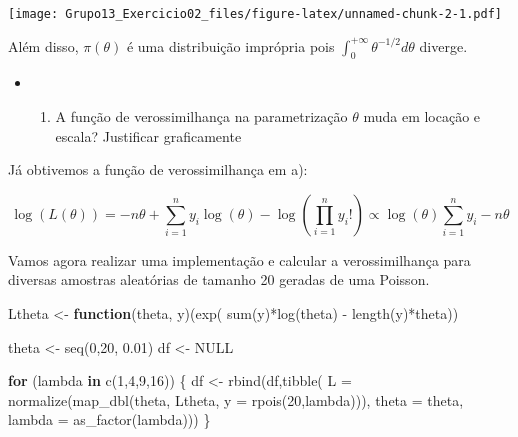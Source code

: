 \documentclass[
]{article}
\newenvironment{Shaded}{\begin{snugshade}}{\end{snugshade}}
\newcommand{\AttributeTok}[1]{\textcolor[rgb]{0.77,0.63,0.00}{#1}}
\newcommand{\ConstantTok}[1]{\textcolor[rgb]{0.00,0.00,0.00}{#1}}
\newcommand{\ControlFlowTok}[1]{\textcolor[rgb]{0.13,0.29,0.53}{\textbf{#1}}}
\newcommand{\DecValTok}[1]{\textcolor[rgb]{0.00,0.00,0.81}{#1}}
\newcommand{\FloatTok}[1]{\textcolor[rgb]{0.00,0.00,0.81}{#1}}
\newcommand{\FunctionTok}[1]{\textcolor[rgb]{0.00,0.00,0.00}{#1}}
\newcommand{\NormalTok}[1]{#1}
\newcommand{\OtherTok}[1]{\textcolor[rgb]{0.56,0.35,0.01}{#1}}
\newcommand{\SpecialCharTok}[1]{\textcolor[rgb]{0.00,0.00,0.00}{#1}}
\providecommand{\tightlist}{%
  \setlength{\itemsep}{0pt}\setlength{\parskip}{0pt}}
\begin{document}
\texttt{[image: Grupo13\_Exercicio02\_files/figure-latex/unnamed-chunk-2-1.pdf]}

Além disso, \(\pi(\theta)\) é uma distribuição imprópria pois
\(\int_0^{+\infty} \theta^{-1/2}d\theta\) diverge.

\begin{itemize}
\item
  \begin{enumerate}
  \def\labelenumi{\alph{enumi})}
  \setcounter{enumi}{1}
  \tightlist
  \item
    A função de verossimilhança na parametrização \(\theta\) muda em
    locação e escala? Justificar graficamente
  \end{enumerate}
\end{itemize}

Já obtivemos a função de verossimilhança em a):

\[\log(L(\theta)) = -n\theta + \sum_{i=1}^n y_i\log(\theta) - \log\left(\prod_{i=1}^n y_i!\right) \propto
\log(\theta)\sum_{i=1}^n y_i -n\theta \]

Vamos agora realizar uma implementação e calcular a verossimilhança para
diversas amostras aleatórias de tamanho 20 geradas de uma Poisson.

\begin{Shaded}
\begin{Highlighting}[]
\NormalTok{Ltheta }\OtherTok{\textless{}{-}} \ControlFlowTok{function}\NormalTok{(theta, y)(}\FunctionTok{exp}\NormalTok{( }\FunctionTok{sum}\NormalTok{(y)}\SpecialCharTok{*}\FunctionTok{log}\NormalTok{(theta) }\SpecialCharTok{{-}} \FunctionTok{length}\NormalTok{(y)}\SpecialCharTok{*}\NormalTok{theta))}

\NormalTok{theta }\OtherTok{\textless{}{-}} \FunctionTok{seq}\NormalTok{(}\DecValTok{0}\NormalTok{,}\DecValTok{20}\NormalTok{, }\FloatTok{0.01}\NormalTok{)}
\NormalTok{df }\OtherTok{\textless{}{-}} \ConstantTok{NULL}

\ControlFlowTok{for}\NormalTok{ (lambda }\ControlFlowTok{in} \FunctionTok{c}\NormalTok{(}\DecValTok{1}\NormalTok{,}\DecValTok{4}\NormalTok{,}\DecValTok{9}\NormalTok{,}\DecValTok{16}\NormalTok{)) \{}
\NormalTok{    df }\OtherTok{\textless{}{-}} \FunctionTok{rbind}\NormalTok{(df,}\FunctionTok{tibble}\NormalTok{(}
                          \AttributeTok{L =} \FunctionTok{normalize}\NormalTok{(}\FunctionTok{map\_dbl}\NormalTok{(theta, Ltheta, }\AttributeTok{y =} \FunctionTok{rpois}\NormalTok{(}\DecValTok{20}\NormalTok{,lambda))),}
                          \AttributeTok{theta =}\NormalTok{ theta,}
                          \AttributeTok{lambda =} \FunctionTok{as\_factor}\NormalTok{(lambda)))}
\NormalTok{\}}
\end{Highlighting}
\end{Shaded}
\end{document}
